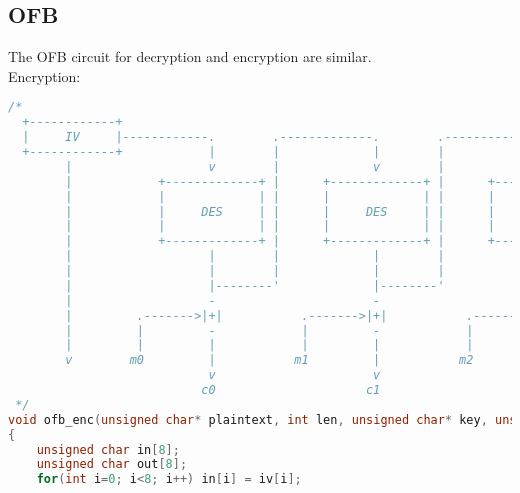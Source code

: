 \documentclass{article}
\begin{document}
\subsection{OFB}
The OFB circuit for decryption and encryption are similar.\\
Encryption:
\begin{lstlisting}[language=c]
/*
  +------------+                                                   
  |     IV     |------------.        .-------------.        .-------------.        .-  ...                                                                      
  +------------+            |        |             |        |             |        |                                                    
        |                   v        |             v        |             v        |                                                      
        |            +-------------+ |      +-------------+ |      +-------------+ |                                                
        |            |             | |      |             | |      |             | |                                                    
        |            |     DES     | |      |     DES     | |      |     DES     | |                                                      
        |            |             | |      |             | |      |             | |                                                    
        |            +-------------+ |      +-------------+ |      +-------------+ |                                                  
        |                   |        |             |        |             |        |                                                   
        |                   |        |             |        |             |        |                                                   
        |                   |--------'             |--------'             |--------'                                                   
        |                   -                      -                      -                                                                
        |         .------->|+|           .------->|+|           .------->|+|                                                             
        |         |         -            |         -            |         -                                                            
        |         |         |            |         |            |         |                                                             
        v        m0         |           m1         |           m2         |                                                               
                            v                      v                      v                                                          
                           c0                     c1                     c2                                                          
 */
void ofb_enc(unsigned char* plaintext, int len, unsigned char* key, unsigned char* iv, unsigned char* ciphertext)
{
    unsigned char in[8];
    unsigned char out[8];
    for(int i=0; i<8; i++) in[i] = iv[i];


\end{lstlisting}
\end{document}
